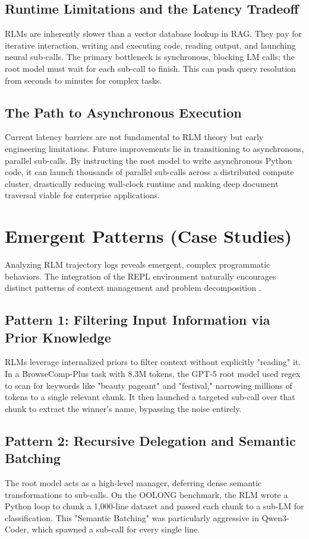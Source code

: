 \subsection{Runtime Limitations and the Latency Tradeoff}
RLMs are inherently slower than a vector database lookup in RAG. They pay for iterative interaction, writing and executing code, reading output, and launching neural sub-calls. The primary bottleneck is synchronous, blocking LM calls; the root model must wait for each sub-call to finish. This can push query resolution from seconds to minutes for complex tasks.



\subsection{The Path to Asynchronous Execution}
Current latency barriers are not fundamental to RLM theory but early engineering limitations. Future improvements lie in transitioning to asynchronous, parallel sub-calls. By instructing the root model to write asynchronous Python code, it can launch thousands of parallel sub-calls across a distributed compute cluster, drastically reducing wall-clock runtime and making deep document traversal viable for enterprise applications.

\section{Emergent Patterns (Case Studies)}
Analyzing RLM trajectory logs reveals emergent, complex programmatic behaviors. The integration of the REPL environment naturally encourages distinct patterns of context management and problem decomposition \cite{zhang2025}.

\subsection{Pattern 1: Filtering Input Information via Prior Knowledge}
RLMs leverage internalized priors to filter context without explicitly "reading" it. In a BrowseComp-Plus task with 8.3M tokens, the GPT-5 root model used regex to scan for keywords like "beauty pageant" and "festival," narrowing millions of tokens to a single relevant chunk. It then launched a targeted sub-call over that chunk to extract the winner's name, bypassing the noise entirely.



\subsection{Pattern 2: Recursive Delegation and Semantic Batching}
The root model acts as a high-level manager, deferring dense semantic transformations to sub-calls. On the OOLONG benchmark, the RLM wrote a Python loop to chunk a 1,000-line dataset and passed each chunk to a sub-LM for classification. This "Semantic Batching" was particularly aggressive in Qwen3-Coder, which spawned a sub-call for every single line.



